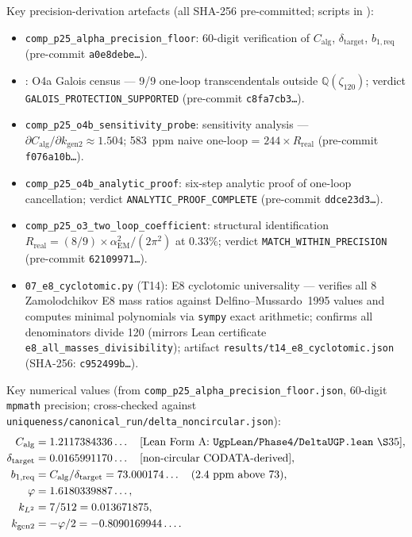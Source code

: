 \documentclass[11pt]{article}
\theoremstyle{remark}
\newcommand{\bonereq}{b_{1,\mathrm{req}}}
\newcommand{\deltatar}{\delta_{\mathrm{target}}}
\newcommand{\Calg}{C_{\mathrm{alg}}}
\newcommand{\zetaN}[1]{\zeta_{#1}}
\newcommand{\PHI}{\varphi}
\begin{document}
Key precision-derivation artefacts (all SHA-256 pre-committed;
scripts in ):
\begin{itemize}[leftmargin=1.5em,itemsep=2pt]
  \item \texttt{comp\_p25\_alpha\_precision\_floor}: 60-digit verification of
    $\Calg$, $\deltatar$, $\bonereq$ (pre-commit \texttt{a0e8debe\ldots}).
  \item {}: O4a Galois census ---
    9/9 one-loop transcendentals outside $\mathbb{Q}(\zetaN{120})$; verdict
    \texttt{GALOIS\_PROTECTION\_SUPPORTED} (pre-commit \texttt{c8fa7cb3\ldots}).
  \item \texttt{comp\_p25\_o4b\_sensitivity\_probe}: sensitivity analysis ---
    $\partial\Calg/\partial k_{\mathrm{gen2}} \approx 1.504$; 583~ppm naive
    one-loop = $244\times R_{\mathrm{real}}$ (pre-commit \texttt{f076a10b\ldots}).
  \item \texttt{comp\_p25\_o4b\_analytic\_proof}: six-step analytic proof of
    one-loop cancellation; verdict \texttt{ANALYTIC\_PROOF\_COMPLETE}
    (pre-commit \texttt{ddce23d3\ldots}).
  \item \texttt{comp\_p25\_o3\_two\_loop\_coefficient}: structural identification
    $R_{\mathrm{real}} = (8/9) \times \alpha_{\mathrm{EM}}^2/(2\pi^2)$ at
    $0.33\%$; verdict \texttt{MATCH\_WITHIN\_PRECISION}
    (pre-commit \texttt{62109971\ldots}).
  \item \texttt{07\_e8\_cyclotomic.py} (T14): E8 cyclotomic universality ---
    verifies all 8 Zamolodchikov E8 mass ratios against
    Delfino--Mussardo~1995 values and computes minimal polynomials via
    \texttt{sympy} exact arithmetic;
    confirms all denominators divide 120 (mirrors Lean certificate
    \texttt{e8\_all\_masses\_divisibility});
    artifact \texttt{results/t14\_e8\_cyclotomic.json}
    (SHA-256: \texttt{c952499b\ldots}).
\end{itemize}

Key numerical values (from
\texttt{comp\_p25\_alpha\_precision\_floor.json},
60-digit \texttt{mpmath} precision; cross-checked against
\texttt{uniqueness/canonical\_run/\allowbreak delta\_noncircular.json}):
\begin{align*}
  \Calg &= 1.2117384336\ldots
        \quad\text{[Lean Form A: \texttt{UgpLean/Phase4/DeltaUGP.lean} \S35]}, \\
  \deltatar &= 0.0165991170\ldots
            \quad\text{[non-circular CODATA-derived]}, \\
  \bonereq &= \Calg/\deltatar = 73.000174\ldots
           \quad\text{($2.4$~ppm above 73)}, \\
  \PHI &= 1.6180339887\ldots, \\
  k_{L^2} &= 7/512 = 0.013671875, \\
  k_{\mathrm{gen2}} &= -\PHI/2 = -0.8090169944\ldots.
\end{align*}
\end{document}
